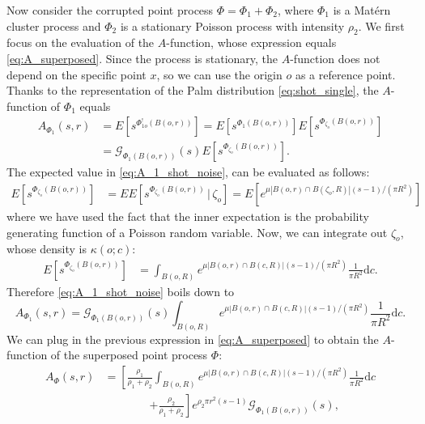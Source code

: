\documentclass[11pt,a4paper,oneside]{article}
\newcommand{\dd}{\mathrm d}
\newcommand{\E}{E}
\renewcommand{\mid}{\ensuremath{\,|\,}}
\theoremstyle{definition}
\theoremstyle{remark}
\begin{document}
Now consider the corrupted point process $\Phi= \Phi_1+ \Phi_2$, where $\Phi_1$ is a Mat\'ern cluster process and $\Phi_2$ is a stationary Poisson process with intensity $\rho_2$.
We first focus on the evaluation of the $A$-function, whose expression equals \eqref{eq:A_superposed}.
Since the process is stationary, the $A$-function does not depend on the specific point $x$, so we can use the origin $o$ as a reference point. 
Thanks to the representation of the Palm distribution \eqref{eq:shot_single}, the $A$-function of $\Phi_1$ equals
\begin{equation} \label{eq:A_1_shot_noise}
\begin{split}
      A_{\Phi_1} (s, r) & = \E \left[ s^{\Phi_{1o}^! (B(o,r))}\right] = \E \left[ s^{ \Phi_1 (B (o, r))}\right] \E \left[s^{ \Phi_{\zeta_o} (B (o, r))}\right] \\
   & =  \mathcal{G}_{\Phi_1 (B (o, r))} (s) \E \left[s^{ \Phi_{\zeta_o} (B (o, r))}\right] .
\end{split}
\end{equation}
The expected value in \eqref{eq:A_1_shot_noise}, can be evaluated as follows:
\begin{align*}
    \E \left[s^{ \Phi_{\zeta_o} (B (o, r))}\right] & = \E \E  \left[s^{ \Phi_{\zeta_o} (B (o, r))} \mid \zeta_o\right]  = \E \left[ e^{\mu |B (o, r) \cap B (\zeta_o, R)| (s-1)/(\pi R^2)}\right]
\end{align*}
where we have used the fact that the inner expectation is the probability generating function of a Poisson random variable. Now, we can integrate out $\zeta_o$, whose density is $\kappa(o ; c)$:
\begin{align*}
    \E \left[s^{ \Phi_{\zeta_o} (B (o, r))}\right] & = \int_{B (o, R)} e^{\mu |B (o, r) \cap B (c, R)| (s-1)/(\pi R^2)} \frac{1}{\pi R^2} \dd c.
\end{align*}
Therefore \eqref{eq:A_1_shot_noise} boils down to
\[
A_{\Phi_1} (s, r)  =   \mathcal{G}_{\Phi_1 (B (o, r))} (s) \int_{B (o, R)} e^{\mu |B (o, r) \cap B (c, R)| (s-1)/(\pi R^2)} \frac{1}{\pi R^2} \dd c .
\]
We can plug in the previous expression in \eqref{eq:A_superposed} to obtain the $A$-function of the superposed point process $\Phi$:
\begin{equation}
    \label{eq:A_superposed_shot_noise}
    \begin{split}
    A_{\Phi} (s, r) &= \left[\frac{\rho_1}{\rho_1+ \rho_2} \int_{B (o, R)}  e^{\mu |B (o, r) \cap B (c, R)| (s-1)/(\pi R^2)} \frac{1}{\pi R^2} \dd c
\right.  \\
& \qquad \qquad \left. +  \frac{\rho_2}{\rho_1+ \rho_2}  \right] e^{\rho_2 \pi r^2 (s-1)}\mathcal{G}_{\Phi_1 (B (o, r))} (s),
\end{split}
\end{equation}
\end{document}
